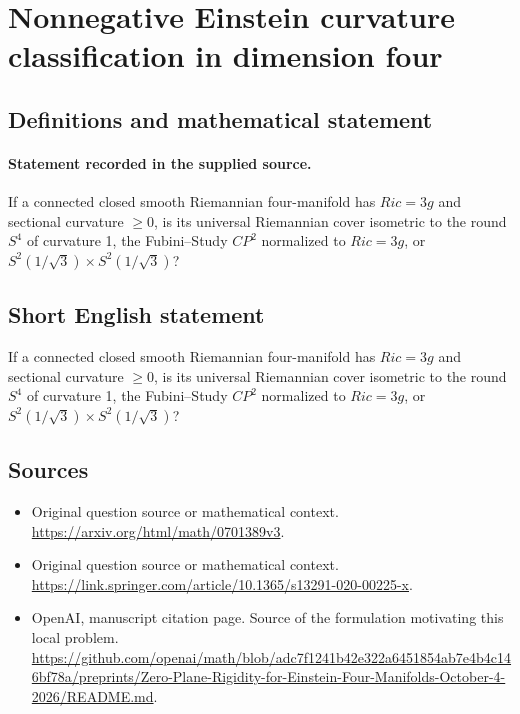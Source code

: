 \documentclass[11pt]{article}
\begin{document}
\section*{Nonnegative Einstein curvature classification in dimension four}\label{30007151}
\subsection{Definitions and mathematical statement}
\paragraph{Statement recorded in the supplied source.}
If a connected closed smooth Riemannian four-manifold has $Ric=3g$ and sectional curvature $\geq 0$, is its universal Riemannian cover isometric to the round $S^{4}$ of curvature 1, the Fubini–Study $CP^{2}$ normalized to $Ric=3g$, or $S^{2}(1/\surd 3)×S^{2}(1/\surd 3)$?
\subsection{Short English statement}
If a connected closed smooth Riemannian four-manifold has $Ric=3g$ and sectional curvature $\geq 0$, is its universal Riemannian cover isometric to the round $S^{4}$ of curvature 1, the Fubini–Study $CP^{2}$ normalized to $Ric=3g$, or $S^{2}(1/\surd 3)×S^{2}(1/\surd 3)$?
\subsection{Sources}
\begin{itemize}
\item[S1] Original question source or mathematical context.
\url{https://arxiv.org/html/math/0701389v3}.
\item[S2] Original question source or mathematical context.
\url{https://link.springer.com/article/10.1365/s13291-020-00225-x}.
\item[S3] OpenAI, manuscript citation page. Source of the formulation motivating this local problem.
\url{https://github.com/openai/math/blob/adc7f1241b42e322a6451854ab7e4b4c146bf78a/preprints/Zero-Plane-Rigidity-for-Einstein-Four-Manifolds-October-4-2026/README.md}.
\end{itemize}
\end{document}
